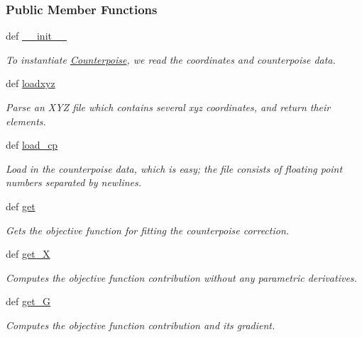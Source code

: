 \subsubsection*{Public Member Functions}
\begin{DoxyCompactItemize}
\item 
def \hyperlink{classforcebalance_1_1counterpoise_1_1Counterpoise_a59ca75843c1cc5fec89f40c8a220039d}{\-\_\-\-\_\-init\-\_\-\-\_\-}
\begin{DoxyCompactList}\small\item\em To instantiate \hyperlink{classforcebalance_1_1counterpoise_1_1Counterpoise}{Counterpoise}, we read the coordinates and counterpoise data. \end{DoxyCompactList}\item 
def \hyperlink{classforcebalance_1_1counterpoise_1_1Counterpoise_a8795bd01b0f62b3f612e4e5c762f96f8}{loadxyz}
\begin{DoxyCompactList}\small\item\em Parse an X\-Y\-Z file which contains several xyz coordinates, and return their elements. \end{DoxyCompactList}\item 
def \hyperlink{classforcebalance_1_1counterpoise_1_1Counterpoise_afdbc053ae726ac5e4066087bcc1039b1}{load\-\_\-cp}
\begin{DoxyCompactList}\small\item\em Load in the counterpoise data, which is easy; the file consists of floating point numbers separated by newlines. \end{DoxyCompactList}\item 
def \hyperlink{classforcebalance_1_1counterpoise_1_1Counterpoise_a5fd50a4bb7d5e939b7e99ac648b35d59}{get}
\begin{DoxyCompactList}\small\item\em Gets the objective function for fitting the counterpoise correction. \end{DoxyCompactList}\item 
def \hyperlink{classforcebalance_1_1target_1_1Target_a606dd136f195c267c05a2455405e5949}{get\-\_\-\-X}
\begin{DoxyCompactList}\small\item\em Computes the objective function contribution without any parametric derivatives. \end{DoxyCompactList}\item 
def \hyperlink{classforcebalance_1_1target_1_1Target_afa8cc38c8bba8861c072e789717aa049}{get\-\_\-\-G}
\begin{DoxyCompactList}\small\item\em Computes the objective function contribution and its gradient. \end{DoxyCompactList}\item 

\end{DoxyCompactItemize}
